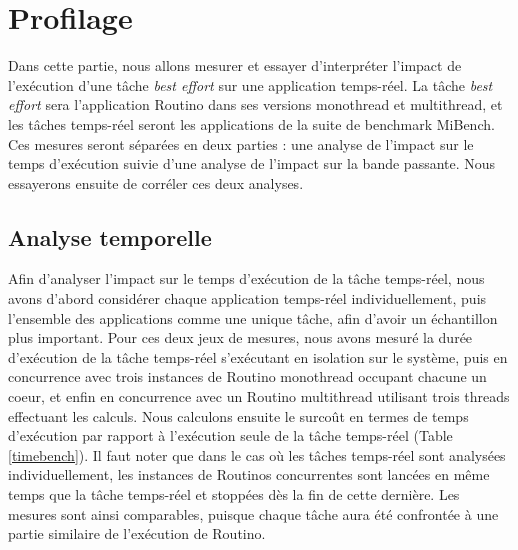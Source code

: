 \section{Profilage}

Dans cette partie, nous allons mesurer et essayer d'interpréter l'impact de 
l'exécution d'une tâche \textit{best effort} sur une application temps-réel.
La tâche \textit{best effort} sera l'application Routino dans ses versions
monothread et multithread, et les tâches temps-réel seront les applications de
la suite de benchmark MiBench\cite{guthaus_mibench:_2001}. Ces mesures seront
séparées en deux parties : une analyse de l'impact sur le temps d'exécution
suivie d'une analyse de l'impact sur la bande passante. Nous essayerons ensuite
de corréler ces deux analyses.

\subsection{Analyse temporelle}
Afin d'analyser l'impact sur le temps d'exécution de la tâche temps-réel, nous
avons d'abord considérer chaque application temps-réel individuellement, puis
l'ensemble des applications comme une unique tâche, afin d'avoir un échantillon
plus important. Pour ces deux jeux de mesures, nous avons mesuré la durée 
d'exécution de la tâche temps-réel s'exécutant en isolation sur le système,
puis en concurrence avec trois instances de Routino monothread occupant
chacune un coeur, et enfin en concurrence avec un Routino multithread utilisant
trois threads effectuant les calculs. Nous calculons ensuite le surcoût en
termes de temps d'exécution par rapport à l'exécution seule de la tâche
temps-réel (Table \ref{timebench}). Il faut noter que
dans le cas où les tâches temps-réel sont analysées individuellement, les 
instances de Routinos concurrentes sont lancées en même temps que la tâche 
temps-réel et stoppées dès la fin de cette dernière. Les mesures sont ainsi
comparables, puisque chaque tâche aura été confrontée à une partie similaire 
de l'exécution de Routino.

